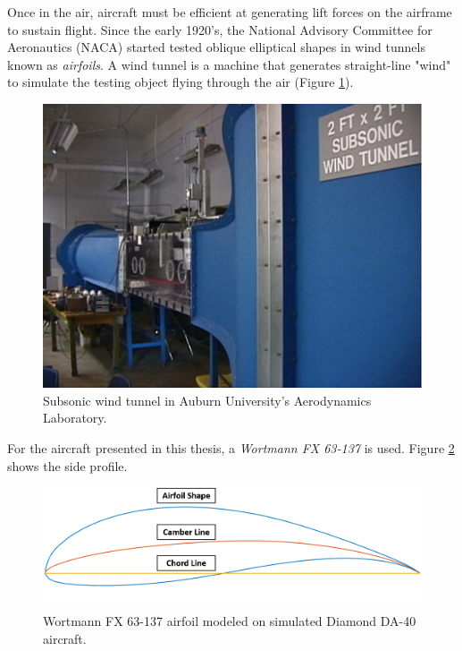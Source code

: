 \documentclass[../chapter_2.tex]{subfiles}
\begin{document}
Once in the air, aircraft must be efficient at generating lift forces on the airframe to sustain flight. Since the early 1920's, the National Advisory Committee for Aeronautics (NACA) started tested oblique elliptical shapes in wind tunnels known as \textit{airfoils}. A wind tunnel is a machine that generates straight-line "wind" to simulate the testing object flying through the air (Figure \ref{fig:windtunnel}).

\begin{figure}[!h]
        \centering
    \includegraphics[width=.75\linewidth]{../../Figures/opencircuitwindtunnel.jpg}
    \caption{Subsonic wind tunnel in Auburn University's Aerodynamics Laboratory.}
    \label{fig:windtunnel}
\end{figure}

For the aircraft presented in this thesis, a \textit{Wortmann FX 63-137} is used. Figure \ref{fig:airfoil} shows the side profile.

\begin{figure}[!h]
        \centering
    \includegraphics[width=\linewidth]{../../Figures/da40airfoil.png}
    \caption{Wortmann FX 63-137 airfoil modeled on simulated Diamond DA-40 aircraft.}
    \label{fig:airfoil}
\end{figure}
\end{document}
